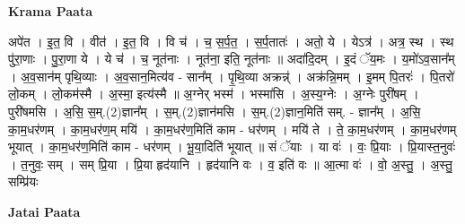\documentclass[17pt]{extarticle}
\begin{document}
\textbf{Krama Paata} \newline

अपे॑त । इ॒त॒ वि । वीत॑ । इ॒त॒ वि । वि च॑ । च॒ स॒र्प॒त॒ । स॒र्प॒तातः॑ । अतो॒ ये । येऽत्र॑ । अत्र॒ स्थ । स्थ पु॑रा॒णाः । पु॒रा॒णा ये । ये च॑ । च॒ नूत॑नाः । नूत॑ना॒ इति॒ नूत॑नाः ॥ अदा॑दि॒दम् । इ॒दं ॅय॒मः । य॒मो॑ऽव॒सान᳚म् । अ॒व॒सान॑म् पृथि॒व्याः । अ॒व॒सान॒मित्य॑व - सान᳚म् । पृ॒थि॒व्या अक्रन्न्॑ । अक्र॑न्नि॒मम् । इ॒मम् पि॒तरः॑ । पि॒तरो॑ लो॒कम् । लो॒कम॑स्मै । अ॒स्मा॒ इत्य॑स्मै ॥ अ॒ग्नेर् भस्म॑ । भस्मा॑सि । अ॒स्य॒ग्नेः । अ॒ग्नेः पुरी॑षम् । पुरी॑षमसि । अ॒सि॒ स॒म्.(2)ज्ञान᳚म् । स॒म्.(2)ज्ञान॑मसि । स॒म्.(2)ज्ञान॒मिति॑ सम्. - ज्ञान᳚म् । अ॒सि॒ का॒म॒धर॑णम् । का॒म॒धर॑ण॒म् मयि॑ । का॒म॒धर॑ण॒मिति॑ काम - धर॑णम् । मयि॑ ते । ते॒ का॒म॒धर॑णम् । का॒म॒धर॑णम् भूयात् । का॒म॒धर॑ण॒मिति॑ काम - धर॑णम् । भू॒या॒दिति॑ भूयात् ॥ सं ॅयाः । या वः॑ । वः॒ प्रि॒याः । प्रि॒यास्त॒नुवः॑ । त॒नुवः॒ सम् । सम् प्रि॒या । प्रि॒या हृद॑यानि । हृद॑यानि वः । व॒ इति॑ वः ॥ आ॒त्मा वः॑ । वो॒ अ॒स्तु॒ । अ॒स्तु॒ सम्प्रि॑यः \newline

\textbf{Jatai Paata} \newline
\end{document}
